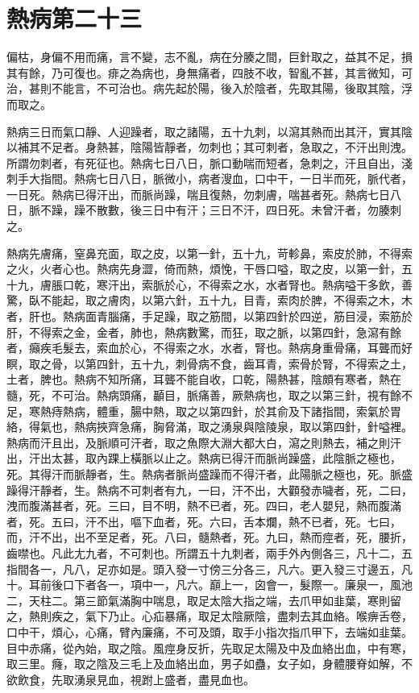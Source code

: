 \section{熱病第二十三}

偏枯，身偏不用而痛，言不變，志不亂，病在分腠之間，巨針取之，益其不足，損其有餘，乃可復也。痱之為病也，身無痛者，四肢不收，智亂不甚，其言微知，可治，甚則不能言，不可治也。病先起於陽，後入於陰者，先取其陽，後取其陰，浮而取之。

熱病三日而氣口靜、人迎躁者，取之諸陽，五十九刺，以瀉其熱而出其汗，實其陰以補其不足者。身熱甚，陰陽皆靜者，勿刺也；其可刺者，急取之，不汗出則洩。所謂勿刺者，有死征也。熱病七日八日，脈口動喘而短者，急刺之，汗且自出，淺刺手大指間。熱病七日八日，脈微小，病者溲血，口中干，一日半而死，脈代者，一日死。熱病已得汗出，而脈尚躁，喘且復熱，勿刺膚，喘甚者死。熱病七日八日，脈不躁，躁不散數，後三日中有汗；三日不汗，四日死。未曾汗者，勿腠刺之。

熱病先膚痛，窒鼻充面，取之皮，以第一針，五十九，苛軫鼻，索皮於肺，不得索之火，火者心也。熱病先身澀，倚而熱，煩悗，干唇口嗌，取之皮，以第一針，五十九，膚脹口乾，寒汗出，索脈於心，不得索之水，水者腎也。熱病嗌干多飲，善驚，臥不能起，取之膚肉，以第六針，五十九，目青，索肉於脾，不得索之木，木者，肝也。熱病面青腦痛，手足躁，取之筋間，以第四針於四逆，筋目浸，索筋於肝，不得索之金，金者，肺也，熱病數驚，而狂，取之脈，以第四針，急瀉有餘者，癲疾毛髮去，索血於心，不得索之水，水者，腎也。熱病身重骨痛，耳聾而好瞑，取之骨，以第四針，五十九，刺骨病不食，齒耳青，索骨於腎，不得索之土，土者，脾也。熱病不知所痛，耳聾不能自收，口乾，陽熱甚，陰頗有寒者，熱在髓，死，不可治。熱病頭痛，顳目，脈痛善，厥熱病也，取之以第三針，視有餘不足，寒熱痔熱病，體重，腸中熱，取之以第四針，於其俞及下諸指間，索氣於胃絡，得氣也，熱病挾齊急痛，胸脅滿，取之湧泉與陰陵泉，取以第四針，針嗌裡。熱病而汗且出，及脈順可汗者，取之魚際大淵大都大白，瀉之則熱去，補之則汗出，汗出太甚，取內踝上橫脈以止之。熱病已得汗而脈尚躁盛，此陰脈之極也，死。其得汗而脈靜者，生。熱病者脈尚盛躁而不得汗者，此陽脈之極也，死。脈盛躁得汗靜者，生。熱病不可刺者有九，一曰，汗不出，大顴發赤噦者，死，二曰，洩而腹滿甚者，死。三曰，目不明，熱不已者，死。四曰，老人嬰兒，熱而腹滿者，死。五曰，汗不出，嘔下血者，死。六曰，舌本爛，熱不已者，死。七曰，而，汗不出，出不至足者，死。八曰，髓熱者，死。九曰，熱而痙者，死，腰折，齒噤也。凡此尢九者，不可刺也。所謂五十九刺者，兩手外內側各三，凡十二，五指間各一，凡八，足亦如是。頭入發一寸傍三分各三，凡六。更入發三寸邊五，凡十。耳前後口下者各一，項中一，凡六。巔上一，囟會一，髮際一。廉泉一，風池二，天柱二。第三節氣滿胸中喘息，取足太陰大指之端，去爪甲如韭葉，寒則留之，熱則疾之，氣下乃止。心疝暴痛，取足太陰厥陰，盡刺去其血絡。喉痹舌卷，口中干，煩心，心痛，臂內廉痛，不可及頭，取手小指次指爪甲下，去端如韭葉。目中赤痛，從內始，取之陰。風痙身反折，先取足太陽及中及血絡出血，中有寒，取三里。癃，取之陰及三毛上及血絡出血，男子如蠱，女子如，身體腰脊如解，不欲飲食，先取湧泉見血，視跗上盛者，盡見血也。



